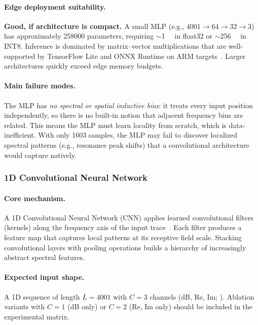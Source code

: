 \paragraph{Edge deployment suitability.}
\textbf{Good, if architecture is compact.}  A small MLP
(e.g., $4001 \to 64 \to 32 \to 3$) has approximately
\num{258000} parameters, requiring $\sim$\SI{1}{\mega\byte} in
float32 or $\sim$\SI{256}{\kilo\byte} in INT8.  Inference is
dominated by matrix--vector multiplications that are well-supported
by TensorFlow Lite and ONNX Runtime on ARM
targets~\cite{tensorflow_lite, onnx_runtime}.  Larger architectures
quickly exceed edge memory budgets.

\paragraph{Main failure modes.}
The MLP has \emph{no spectral or spatial inductive bias}: it treats
every input position independently, so there is no built-in notion
that adjacent frequency bins are related.  This means the MLP must
learn locality from scratch, which is data-inefficient.  With only
\num{1603} samples, the MLP may fail to discover localized spectral
patterns (e.g., resonance peak shifts) that a convolutional
architecture would capture natively.


\subsubsection{1D Convolutional Neural Network}\label{subsec:cnn1d}

\paragraph{Core mechanism.}
A 1D Convolutional Neural Network (CNN) applies learned convolutional
filters (kernels) along the frequency axis of the input
trace~\cite{lecun1998cnn}.  Each filter produces a feature map that
captures local patterns at its receptive field scale.  Stacking
convolutional layers with pooling operations builds a hierarchy of
increasingly abstract spectral features.

\paragraph{Expected input shape.}
A 1D sequence of length $L = 4001$ with $C = 3$ channels (dB, Re, Im;
).  Ablation variants with $C = 1$ (dB
only) or $C = 2$ (Re, Im only) should be included in the experimental
matrix.

